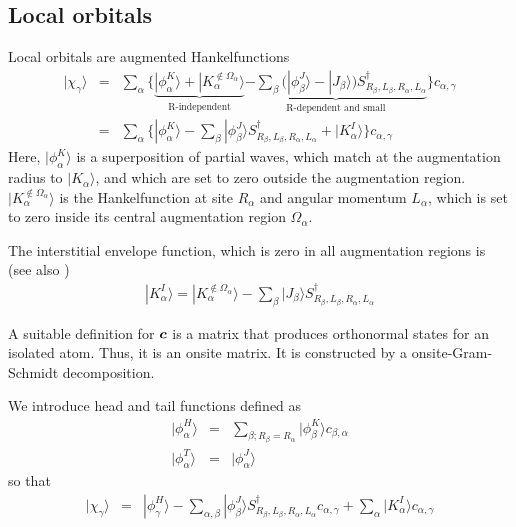 \documentclass[11pt,a4paper]{report}
\begin{document}
\subsection{Local orbitals}
Local orbitals are augmented Hankelfunctions
\begin{eqnarray}
|\chi_\gamma\rangle&=&
\sum_\alpha \biggl\lbrace
\underbrace{
|\phi^{K}_{\alpha}\rangle+ |K^{\notin\Omega_\alpha}_\alpha\rangle
}_{\text{R-independent}}
\underbrace{
-\sum_{\beta}
\biggl(|\phi^J_{\beta}\rangle -|J_{\beta}\rangle\biggr)
S^\dagger_{R_\beta,L_\beta,R_\alpha,L_\alpha}}_{\text{R-dependent and small}}
\biggr\rbrace c_{\alpha,\gamma}
\nonumber\\
&=&\sum_\alpha \biggl\lbrace
|\phi^{K}_{\alpha}\rangle
-\sum_{\beta}
|\phi^J_{\beta}\rangle S^\dagger_{R_\beta,L_\beta,R_\alpha,L_\alpha}
+ |K^{I}_\alpha\rangle
\biggr\rbrace c_{\alpha,\gamma}
\end{eqnarray}
Here, $|\phi^K_\alpha\rangle$ is a superposition of partial waves,
which match at the augmentation radius to $|K_\alpha\rangle$, and
which are set to zero outside the augmentation region.
$|K^{\notin\Omega_\alpha}_\alpha\rangle$ is the Hankelfunction at site
$R_\alpha$ and angular momentum $L_\alpha$, which is set to zero
inside its central augmentation region $\Omega_\alpha$.

The interstitial envelope function, which is zero in all augmentation
regions is (see also )
\begin{eqnarray}
|K^I_\alpha\rangle= |K^{\notin\Omega_\alpha}_\alpha\rangle
-\sum_{\beta}|J_{\beta}\rangle
S^\dagger_{R_\beta,L_\beta,R_\alpha,L_\alpha}
\end{eqnarray}


A suitable definition for $\bm{c}$ is a matrix that produces
orthonormal states for an isolated atom. Thus, it is an onsite matrix.
It is constructed by a onsite-Gram-Schmidt decomposition.

We introduce head and tail functions defined as
\begin{eqnarray}
|\phi^H_\alpha\rangle&=&\sum_{\beta; R_\beta=R_\alpha}
|\phi^K_\beta\rangle c_{\beta,\alpha}
\nonumber\\
|\phi^T_\alpha\rangle&=&|\phi^J_\alpha\rangle
\end{eqnarray}
so that
\begin{eqnarray}
|\chi_\gamma\rangle&=&
|\phi^{H}_{\gamma}\rangle
-\sum_{\alpha,\beta}
|\phi^J_{\beta}\rangle S^\dagger_{R_\beta,L_\beta,R_\alpha,L_\alpha}
c_{\alpha,\gamma}
+\sum_\alpha |K^{I}_\alpha\rangle c_{\alpha,\gamma}
\end{eqnarray}
\end{document}

